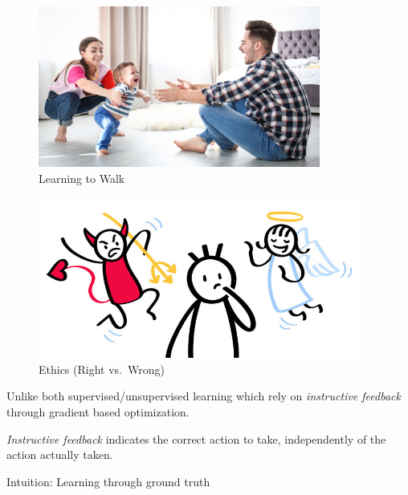 \documentclass[
  letterpaper,
  DIV=11,
  numbers=noendperiod]{scrreprt}
\begin{document}
\begin{figure}[H]

{\centering \includegraphics[width=1\linewidth,height=2.08333in]{lecture1/images/BabyWalking.jpg}

}

\caption{Learning to Walk}

\end{figure}%

\begin{figure}[H]

{\centering \includegraphics[width=1\linewidth,height=2.08333in]{lecture1/images/ethics.jpg}

}

\caption{Ethics (Right vs.~Wrong)}

\end{figure}%

Unlike both supervised/unsupervised learning which rely on
\emph{instructive feedback} through gradient based optimization.

\begin{tcolorbox}[enhanced jigsaw, opacityback=0, left=2mm, breakable, bottomtitle=1mm, rightrule=.15mm, colframe=quarto-callout-tip-color-frame, titlerule=0mm, colback=white, opacitybacktitle=0.6, toptitle=1mm, title=\textcolor{quarto-callout-tip-color}{\faLightbulb}\hspace{0.5em}{Instructive Feedback}, colbacktitle=quarto-callout-tip-color!10!white, bottomrule=.15mm, arc=.35mm, coltitle=black, leftrule=.75mm, toprule=.15mm]

\emph{Instructive feedback} indicates the correct action to take,
independently of the action actually taken.

Intuition: Learning through ground truth

\end{tcolorbox}
\end{document}
